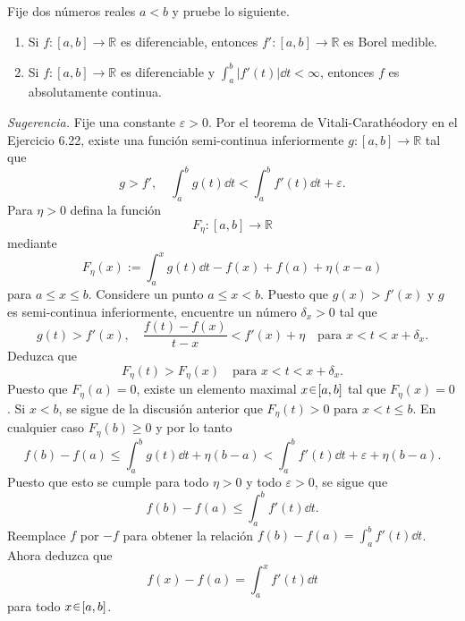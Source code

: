 \setcounter{neje}{22}
\begin{nejer}
Fije dos números reales $a < b$ y pruebe lo siguiente.
\begin{enumerate}[label = (\roman*)]
    \item Si $f \colon [a, b] \to \mathbb{R}$ es diferenciable, entonces $f' \colon [a, b] \to \mathbb{R}$ es Borel medible.
    \item Si $f \colon [a, b] \to \mathbb{R}$ es diferenciable y $\int_a^b |f'(t)| \dd{t} < \infty$, entonces $f$ es absolutamente continua.
\end{enumerate}
\emph{Sugerencia.} Fije una constante $\varepsilon > 0$. Por el teorema de Vitali-Carathéodory en el Ejercicio 6.22, existe una función semi-continua inferiormente $g \colon [a, b] \to \mathbb{R}$ tal que
$$
g > f', \quad \int_a^b g(t) \dd{t} < \int_a^b f'(t) \dd{t} + \varepsilon.
$$
Para $\eta > 0$ defina la función
$$
F_\eta \colon [a, b] \to \mathbb{R}
$$
mediante
$$
F_\eta(x) := \int_a^x g(t) \dd{t} - f(x) + f(a) + \eta(x - a)
$$
para $a \le x \le b$. Considere un punto $a \le x < b$. Puesto que $g(x) > f'(x)$ y $g$ es semi-continua inferiormente, encuentre un número $\delta_x > 0$ tal que
$$
g(t) > f'(x), \quad \frac{f(t) - f(x)}{t - x} < f'(x) + \eta \quad \text{para } x < t < x + \delta_x.
$$
Deduzca que
$$
F_\eta(t) > F_\eta(x) \quad \text{para } x < t < x + \delta_x.
$$
Puesto que $F_\eta(a) = 0$, existe un elemento maximal $x \en [a, b]$ tal que $F_\eta(x) = 0$. Si $x < b$, se sigue de la discusión anterior que $F_\eta(t) > 0$ para $x < t \le b$. En cualquier caso $F_\eta(b) \ge 0$ y por lo tanto
$$
f(b) - f(a) \le \int_a^b g(t) \dd{t} + \eta(b - a) < \int_a^b f'(t) \dd{t} + \varepsilon + \eta(b - a).
$$
Puesto que esto se cumple para todo $\eta > 0$ y todo $\varepsilon > 0$, se sigue que
$$
f(b) - f(a) \le \int_a^b f'(t) \dd{t}.
$$
Reemplace $f$ por $-f$ para obtener la relación $f(b) - f(a) = \int_a^b f'(t) \dd{t}$. Ahora deduzca que
$$
f(x) - f(a) = \int_a^x f'(t) \dd{t}
$$
para todo $x \en [a, b]$.
\end{nejer}
